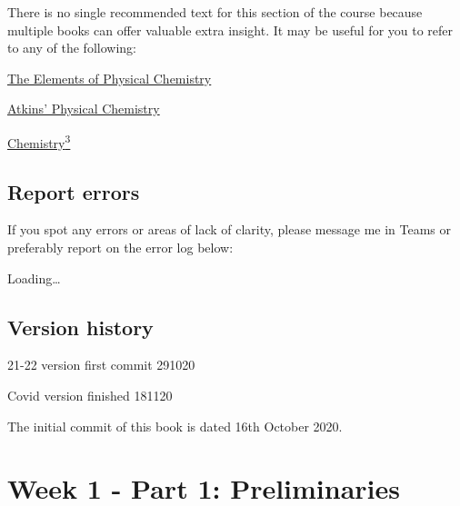 \documentclass[
]{book}
\begin{document}
There is no single recommended text for this section of the course because multiple books can offer valuable extra insight. It may be useful for you to refer to any of the following:

\href{https://bath-ac-primo.hosted.exlibrisgroup.com/primo-explore/search?query=any,contains,Elements\%20of\%20physical\%20chemistry\&tab=local\&sortby=date\&vid=44BAT_VU1\&facet=frbrgroupid,include,978286819\&offset=0\&pcAvailability=false}{The Elements of Physical Chemistry}

\href{https://bath-ac-primo.hosted.exlibrisgroup.com/primo-explore/search?query=any,contains,physical\%20chemistry\%20de\%20paula\&tab=local\&search_scope=CSCOP_44BAT_DEEP\&sortby=date\&vid=44BAT_VU1\&facet=frbrgroupid,include,978327499\&offset=0\&pcAvailability=false}{Atkins' Physical Chemistry}

\href{https://bath-ac-primo.hosted.exlibrisgroup.com/primo-explore/search?query=any,contains,chemistry3\&tab=local\&search_scope=CSCOP_44BAT_DEEP\&sortby=date\&vid=44BAT_VU1\&facet=frbrgroupid,include,978293871\&offset=0\&pcAvailability=false}{Chemistry\textsuperscript{3}}

\hypertarget{report-errors}{%
\section*{Report errors}\label{report-errors}}

If you spot any errors or areas of lack of clarity, please message me in Teams or preferably report on the error log below:

Loading\ldots{}

\hypertarget{version-history}{%
\section*{Version history}\label{version-history}}

21-22 version first commit 291020

Covid version finished 181120

The initial commit of this book is dated 16th October 2020.

\hypertarget{ch:Part1}{%
\chapter{Week 1 - Part 1: Preliminaries}\label{ch:Part1}}
\end{document}
